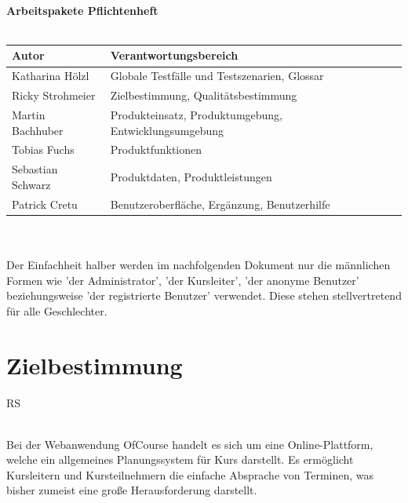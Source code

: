 \documentclass[a4paper]{scrreprt}
\begin{document}
\begin{titlepage}
\begin{center}
        \ \\
        \ \\
        \hspace{3 cm}\\
          \textbf{Arbeitspakete Pflichtenheft} \\
          \ \\
        
        \begin{tabular}{ | l | l |}
        	\hline
        	\textbf{Autor} & \textbf{Verantwortungsbereich} \\ \hline
        	 Katharina Hölzl & Globale Testfälle und Testszenarien, Glossar  \\ \hline
        	 Ricky Strohmeier& Zielbestimmung, Qualitätsbestimmung  \\ \hline
        	 Martin Bachhuber & Produkteinsatz, Produktumgebung, Entwicklungsumgebung  \\ \hline
	         Tobias Fuchs & Produktfunktionen \\ \hline
        	 Sebastian Schwarz & Produktdaten, Produktleistungen \\ \hline  
	         Patrick Cretu  &  Benutzeroberfläche, Ergänzung, Benutzerhilfe  \\ \hline
        \end{tabular}
    \end{center}
\end{titlepage}
 
 


\tableofcontents
 \ \\
 \ \\
Der Einfachheit halber werden im nachfolgenden Dokument nur die männlichen Formen wie 'der Administrator', 'der Kursleiter', 'der anonyme Benutzer' beziehungsweise 'der registrierte Benutzer' verwendet. Diese stehen stellvertretend für alle Geschlechter.
 
\chapter{Zielbestimmung}
	\begin{tiny}
		RS
	\end{tiny}\\
	   Bei der Webanwendung OfCourse handelt es sich um eine Online-Plattform, welche ein allgemeines Planungssystem für \gls{Kurs} darstellt. Es ermöglicht Kursleitern und Kursteilnehmern die einfache Absprache von Terminen, was bisher zumeist eine große Herausforderung darstellt.
\end{document}
